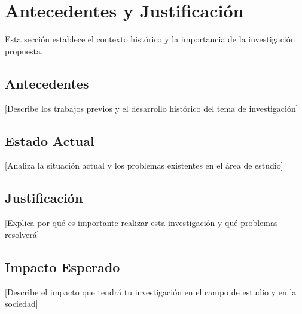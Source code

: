 \section{Antecedentes y Justificación}

Esta sección establece el contexto histórico y la importancia de la investigación propuesta.

\subsection{Antecedentes}
[Describe los trabajos previos y el desarrollo histórico del tema de investigación]

\subsection{Estado Actual}
[Analiza la situación actual y los problemas existentes en el área de estudio]

\subsection{Justificación}
[Explica por qué es importante realizar esta investigación y qué problemas resolverá]

\subsection{Impacto Esperado}
[Describe el impacto que tendrá tu investigación en el campo de estudio y en la sociedad]